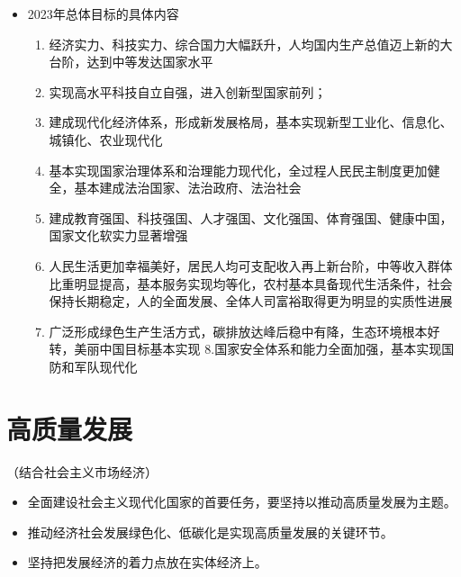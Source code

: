 \documentclass[
]{ctexart}
\providecommand{\tightlist}{%
  \setlength{\itemsep}{0pt}\setlength{\parskip}{0pt}}
\begin{document}
\begin{itemize}
  \begin{itemize}
  \tightlist
  \item
    第一阶段：从二O二O年到二O三五年，在全面建成小康社会的基础上，再奋斗十五年，基本实现社会主义现代化
  \item
    第二阶段：从二O三五年到本世纪中叶，在基本实现现代化的基础上，再奋斗十五年，把我国建成富强民主文明和谐美丽的社会主义现代化强国
  \end{itemize}
\item
  2023年总体目标的具体内容

  \begin{enumerate}
  \def\labelenumi{\arabic{enumi}.}
  \tightlist
  \item
    经济实力、科技实力、综合国力大幅跃升，人均国内生产总值迈上新的大台阶，达到中等发达国家水平
  \item
    实现高水平科技自立自强，进入创新型国家前列；
  \item
    建成现代化经济体系，形成新发展格局，基本实现新型工业化、信息化、城镇化、农业现代化
  \item
    基本实现国家治理体系和治理能力现代化，全过程人民民主制度更加健全，基本建成法治国家、法治政府、法治社会
  \item
    建成教育强国、科技强国、人才强国、文化强国、体育强国、健康中国，国家文化软实力显著增强
  \item
    人民生活更加幸福美好，居民人均可支配收入再上新台阶，中等收入群体比重明显提高，基本服务实现均等化，农村基本具备现代生活条件，社会保持长期稳定，人的全面发展、全体人司富裕取得更为明显的实质性进展
  \item
    广泛形成绿色生产生活方式，碳排放达峰后稳中有降，生态环境根本好转，美丽中国目标基本实现
    8.国家安全体系和能力全面加强，基本实现国防和军队现代化
  \end{enumerate}
\end{itemize}

\hypertarget{ux9ad8ux8d28ux91cfux53d1ux5c55}{%
\section{高质量发展}\label{ux9ad8ux8d28ux91cfux53d1ux5c55}}

（结合社会主义市场经济）

\begin{itemize}
\tightlist
\item
  全面建设社会主义现代化国家的首要任务，要坚持以推动高质量发展为主题。
\item
  推动经济社会发展绿色化、低碳化是实现高质量发展的关键环节。
\item
  坚持把发展经济的着力点放在实体经济上。
\end{itemize}
\end{document}
